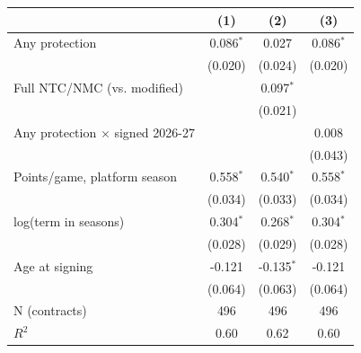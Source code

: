 \begin{tabular}{lccc}\toprule
 & (1) & (2) & (3)\\\midrule
Any protection & 0.086$^{*}$ & 0.027 & 0.086$^{*}$\\
 & (0.020) & (0.024) & (0.020)\\
Full NTC/NMC (vs. modified) &  & 0.097$^{*}$ & \\
 &  & (0.021) & \\
Any protection $\times$ signed 2026-27 &  &  & 0.008\\
 &  &  & (0.043)\\
Points/game, platform season & 0.558$^{*}$ & 0.540$^{*}$ & 0.558$^{*}$\\
 & (0.034) & (0.033) & (0.034)\\
log(term in seasons) & 0.304$^{*}$ & 0.268$^{*}$ & 0.304$^{*}$\\
 & (0.028) & (0.029) & (0.028)\\
Age at signing & -0.121 & -0.135$^{*}$ & -0.121\\
 & (0.064) & (0.063) & (0.064)\\
N (contracts) & 496 & 496 & 496\\
$R^2$ & 0.60 & 0.62 & 0.60\\
\bottomrule\end{tabular}